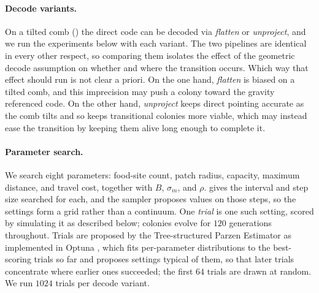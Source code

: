 \documentclass[11pt]{article}
\begin{document}
\paragraph{Decode variants.}
On a tilted comb () the direct code can be decoded via
\emph{flatten} or \emph{unproject}, and we run the experiments below with each
variant.  The two pipelines are identical in every other respect, so comparing
them isolates the effect of the geometric decode assumption on whether and where
the transition occurs. Which way that effect should run is not clear a priori.
On the one hand, \emph{flatten} is biased on a tilted comb, and this imprecision
may push a colony toward the gravity referenced code. On the other hand,
\emph{unproject} keeps direct pointing accurate as the comb tilts and so keeps
transitional colonies more viable, which may instead ease the transition by
keeping them alive long enough to complete it. 

\paragraph{Parameter search.}
We search eight parameters: food-site count, patch radius, capacity, maximum
distance, and travel cost, together with $B$, $\sigma_m$, and $\rho$.
 gives the interval and step size searched for each, and
the sampler proposes values on those steps, so the settings form a
grid rather than a continuum. One \emph{trial} is one such setting, scored by
simulating it as described below; colonies evolve for $120$ generations
throughout. Trials are proposed by the Tree-structured Parzen Estimator
\citep{bergstra2011algorithms} as implemented in Optuna
\citep{akiba2019optuna}, which fits per-parameter distributions to the
best-scoring trials so far and proposes settings typical of them, so that later
trials concentrate where earlier ones succeeded; the first $64$ trials are drawn
at random. We run $1024$ trials per decode variant.
\end{document}
